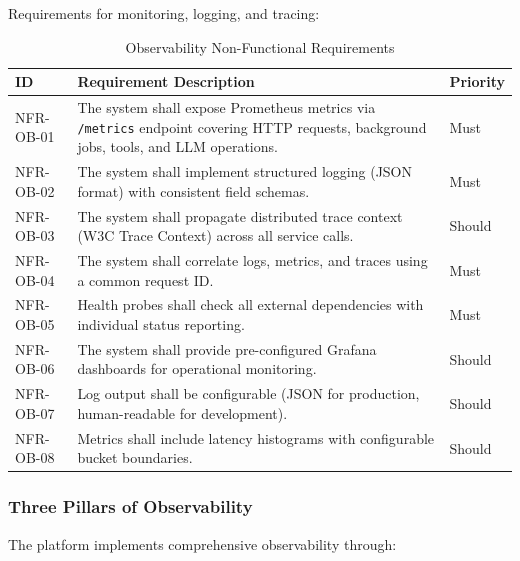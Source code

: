 Requirements for monitoring, logging, and tracing:

\begin{table}[htbp]
\centering
\caption{Observability Non-Functional Requirements}
\label{tab:nfr-observability}
\small
\begin{tabularx}{\textwidth}{|l|X|l|}
\hline
\textbf{ID} & \textbf{Requirement Description} & \textbf{Priority} \\
\hline
NFR-OB-01 & The system shall expose Prometheus metrics via \texttt{/metrics} endpoint covering HTTP requests, background jobs, tools, and LLM operations. & Must \\
\hline
NFR-OB-02 & The system shall implement structured logging (JSON format) with consistent field schemas. & Must \\
\hline
NFR-OB-03 & The system shall propagate distributed trace context (W3C Trace Context) across all service calls. & Should \\
\hline
NFR-OB-04 & The system shall correlate logs, metrics, and traces using a common request ID. & Must \\
\hline
NFR-OB-05 & Health probes shall check all external dependencies with individual status reporting. & Must \\
\hline
NFR-OB-06 & The system shall provide pre-configured Grafana dashboards for operational monitoring. & Should \\
\hline
NFR-OB-07 & Log output shall be configurable (JSON for production, human-readable for development). & Should \\
\hline
NFR-OB-08 & Metrics shall include latency histograms with configurable bucket boundaries. & Should \\
\hline
\end{tabularx}
\end{table}

\subsubsection{Three Pillars of Observability}

The platform implements comprehensive observability through:

